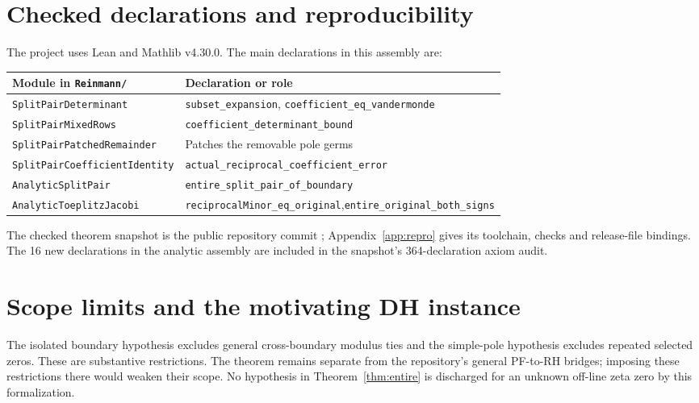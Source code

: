 \documentclass[11pt]{amsart}
\begin{document}
\section{Checked declarations and reproducibility}
The project uses Lean and Mathlib v4.30.0. The main declarations in this assembly are:
\begin{center}\footnotesize
\begin{tabular}{p{}p{}}
\toprule
Module in \texttt{Reinmann/} & Declaration or role\\
\midrule
\texttt{SplitPairDeterminant} & \texttt{subset\_expansion}, \texttt{coefficient\_eq\_vandermonde}\\
\texttt{SplitPairMixedRows} & \texttt{coefficient\_determinant\_bound}\\
\texttt{SplitPairPatchedRemainder} & Patches the removable pole germs\\
\texttt{SplitPairCoefficientIdentity} & \texttt{actual\_reciprocal\_coefficient\_error}\\
\texttt{AnalyticSplitPair} & \texttt{entire\_split\_pair\_of\_boundary}\\
\texttt{AnalyticToeplitzJacobi} & \texttt{reciprocalMinor\_eq\_original},\newline \texttt{entire\_original\_both\_signs}\\
\bottomrule
\end{tabular}
\end{center}
\begingroup\raggedright
The checked theorem snapshot is the public repository commit
; Appendix~\ref{app:repro}
gives its toolchain, checks and release-file bindings. The 16 new declarations
in the analytic assembly are included in the snapshot's 364-declaration axiom audit.
\par\endgroup

\section{Scope limits and the motivating DH instance}
The isolated boundary hypothesis excludes general cross-boundary modulus ties and the simple-pole hypothesis excludes repeated selected zeros. These are substantive restrictions. The theorem remains separate from the repository's general PF-to-RH bridges; imposing these restrictions there would weaken their scope. No hypothesis in Theorem~\ref{thm:entire} is discharged for an unknown off-line zeta zero by this formalization.
\end{document}
